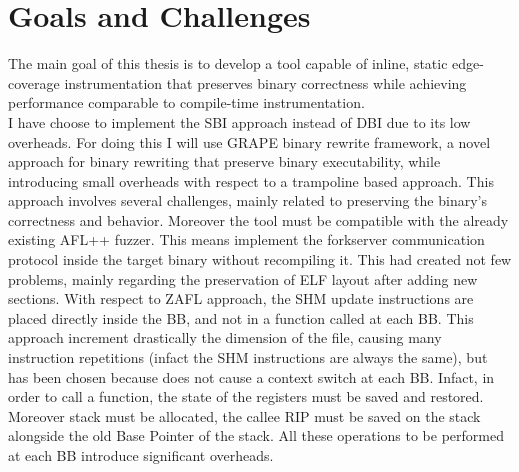     \section{Goals and Challenges}\label{sec:goals-and-challenges}
    The main goal of this thesis is to develop a tool capable of inline, static edge-coverage instrumentation
    that preserves binary correctness while achieving performance comparable to compile-time instrumentation.\\
    I have choose to implement the \gls{SBI} approach instead of \gls{DBI} due to its low overheads.
    For doing this I will use GRAPE binary rewrite framework, a novel approach for binary rewriting that preserve binary executability, 
    while introducing small overheads with respect to a trampoline based approach.
    This approach involves several challenges, mainly related to preserving the binary's correctness and behavior.
    Moreover the tool must be compatible with the already existing AFL++ fuzzer. 
    This means implement the forkserver communication protocol inside the target binary without recompiling it.
    This had created not few problems, mainly regarding the preservation of ELF layout after adding new sections.
    With respect to ZAFL approach, the \gls{SHM} update instructions are placed directly inside the \gls{BB}, and not 
    in a function called at each \gls{BB}.
    This approach increment drastically the dimension of the file, causing many instruction repetitions (infact the \gls{SHM} 
    instructions are always the same), but has been chosen because does not cause a context switch at each \gls{BB}.
    Infact, in order to call a function, the state of the registers must be saved and restored. Moreover stack must be allocated, 
    the callee RIP must be saved on the stack alongside the old Base Pointer of the stack.
    All these operations to be performed at each \gls{BB} introduce significant overheads.
    